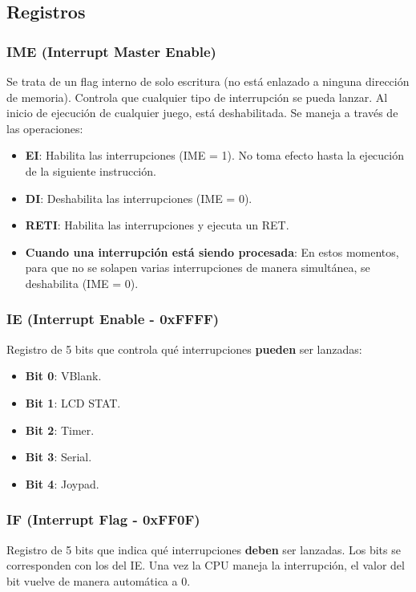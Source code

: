 \subsection{Registros}

\subsubsection{IME (Interrupt Master Enable)}
Se trata de un flag interno de solo escritura (no está enlazado a ninguna dirección de memoria). Controla que cualquier tipo de interrupción se pueda lanzar. Al inicio de ejecución de cualquier juego, está deshabilitada. Se maneja a través de las operaciones:
\begin{itemize}
    \item \textbf{EI}: Habilita las interrupciones (IME = 1). No toma efecto hasta la ejecución de la siguiente instrucción.
    \item \textbf{DI}: Deshabilita las interrupciones (IME = 0).
    \item \textbf{RETI}: Habilita las interrupciones y ejecuta un RET.
    \item \textbf{Cuando una interrupción está siendo procesada}: En estos momentos, para que no se solapen varias interrupciones de manera simultánea, se deshabilita (IME = 0).
\end{itemize}

\subsubsection{IE (Interrupt Enable - 0xFFFF)}
Registro de 5 bits que controla qué interrupciones \textbf{pueden} ser lanzadas:
\begin{itemize}
    \item \textbf{Bit 0}: VBlank.
    \item \textbf{Bit 1}: LCD STAT.
    \item \textbf{Bit 2}: Timer.
    \item \textbf{Bit 3}: Serial.
    \item \textbf{Bit 4}: Joypad.
\end{itemize}

\subsubsection{IF (Interrupt Flag - 0xFF0F)}
Registro de 5 bits que indica qué interrupciones \textbf{deben} ser lanzadas. Los bits se corresponden con los del IE.
Una vez la CPU maneja la interrupción, el valor del bit vuelve de manera automática a 0.

